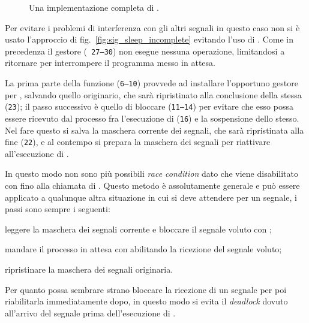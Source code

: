 \begin{figure}[!htbp]
  \footnotesize \centering
  \begin{minipage}[c]{\codesamplewidth}
  \end{minipage} 
  \normalsize 
  \caption{Una implementazione completa di .} 
  \label{fig:sig_sleep_ok}
\end{figure}
 
Per evitare i problemi di interferenza con gli altri segnali in questo caso
non si è usato l'approccio di fig.~\ref{fig:sig_sleep_incomplete} evitando
l'uso di . Come in precedenza il gestore (\texttt{\small
  27--30}) non esegue nessuna operazione, limitandosi a ritornare per
interrompere il programma messo in attesa.

La prima parte della funzione (\texttt{\small 6--10}) provvede ad installare
l'opportuno gestore per , salvando quello originario, che
sarà ripristinato alla conclusione della stessa (\texttt{\small 23}); il passo
successivo è quello di bloccare  (\texttt{\small 11--14}) per
evitare che esso possa essere ricevuto dal processo fra l'esecuzione di
 (\texttt{\small 16}) e la sospensione dello stesso. Nel fare
questo si salva la maschera corrente dei segnali, che sarà ripristinata alla
fine (\texttt{\small 22}), e al contempo si prepara la maschera dei segnali
 per riattivare  all'esecuzione di
.  

In questo modo non sono più possibili \textit{race condition} dato che
 viene disabilitato con  fino alla chiamata
di .  Questo metodo è assolutamente generale e può essere
applicato a qualunque altra situazione in cui si deve attendere per un
segnale, i passi sono sempre i seguenti:
\begin{enumerate*}
\item leggere la maschera dei segnali corrente e bloccare il segnale voluto
  con ;
\item mandare il processo in attesa con  abilitando la
  ricezione del segnale voluto;
\item ripristinare la maschera dei segnali originaria.
\end{enumerate*}
Per quanto possa sembrare strano bloccare la ricezione di un segnale per poi
riabilitarla immediatamente dopo, in questo modo si evita il \textit{deadlock}
dovuto all'arrivo del segnale prima dell'esecuzione di .

